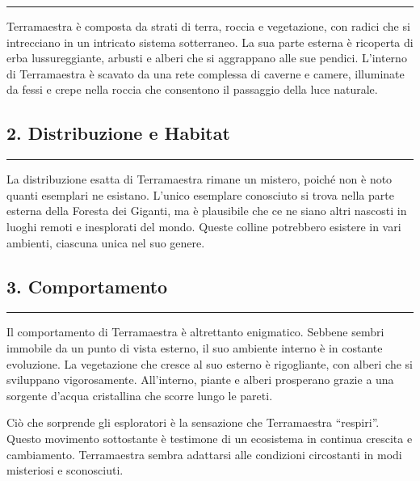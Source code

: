 \begin{center}\rule{0.5\linewidth}{0.5pt}\end{center}

Terramaestra è composta da strati di terra, roccia e vegetazione, con
radici che si intrecciano in un intricato sistema sotterraneo. La sua
parte esterna è ricoperta di erba lussureggiante, arbusti e alberi che
si aggrappano alle sue pendici. L'interno di Terramaestra è scavato da
una rete complessa di caverne e camere, illuminate da fessi e crepe
nella roccia che consentono il passaggio della luce naturale.

\subsection{2. Distribuzione e Habitat}\label{distribuzione-e-habitat}

\begin{center}\rule{0.5\linewidth}{0.5pt}\end{center}

La distribuzione esatta di Terramaestra rimane un mistero, poiché non è
noto quanti esemplari ne esistano. L'unico esemplare conosciuto si trova
nella parte esterna della Foresta dei Giganti, ma è plausibile che ce ne
siano altri nascosti in luoghi remoti e inesplorati del mondo. Queste
colline potrebbero esistere in vari ambienti, ciascuna unica nel suo
genere.

\subsection{3. Comportamento}\label{comportamento}

\begin{center}\rule{0.5\linewidth}{0.5pt}\end{center}

Il comportamento di Terramaestra è altrettanto enigmatico. Sebbene
sembri immobile da un punto di vista esterno, il suo ambiente interno è
in costante evoluzione. La vegetazione che cresce al suo esterno è
rigogliante, con alberi che si sviluppano vigorosamente. All'interno,
piante e alberi prosperano grazie a una sorgente d'acqua cristallina che
scorre lungo le pareti.

Ciò che sorprende gli esploratori è la sensazione che Terramaestra
``respiri''. Questo movimento sottostante è testimone di un ecosistema
in continua crescita e cambiamento. Terramaestra sembra adattarsi alle
condizioni circostanti in modi misteriosi e sconosciuti.

